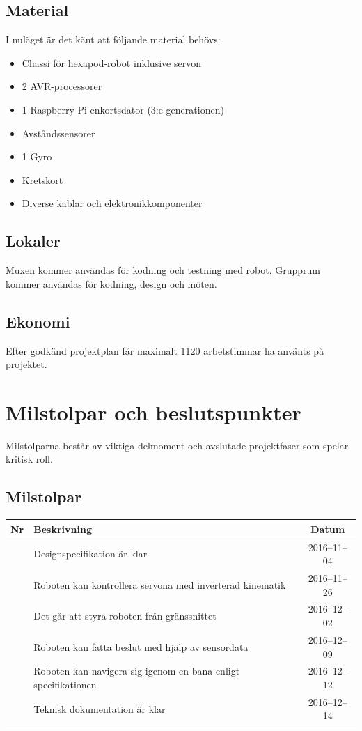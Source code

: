 \documentclass[a4paper,titlepage,12pt]{article}
\newcounter{milNr}
\newcommand{\nextMilNr}{\stepcounter{milNr}\arabic{milNr}}
\begin{document}
	\subsection{Material}
    I nuläget är det känt att följande material behövs:
	\begin{itemize}
			\item Chassi för hexapod-robot inklusive servon
			\item 2 AVR-processorer
			\item 1 Raspberry Pi-enkortsdator (3:e generationen)
			\item Avståndssensorer
            \item 1 Gyro
            \item Kretskort
            \item Diverse kablar och elektronikkomponenter
	\end{itemize}
	
	
	\subsection{Lokaler}
	Muxen kommer användas för kodning och testning med robot. Grupprum kommer
	användas för kodning, design och möten.
	
	
	\subsection{Ekonomi}
	Efter godkänd projektplan får maximalt 1120 arbetstimmar ha använts på projektet.
	
	
	\section{Milstolpar och beslutspunkter}
	Milstolparna består av viktiga delmoment och avslutade projektfaser som
  spelar kritisk roll. 
	
	\subsection{Milstolpar}
	\begin{longtable}[c]{ c l c}
		\textbf{Nr} & \textbf{Beskrivning} & \textbf{Datum} \\ \midrule
		\nextMilNr{} & Designspecifikation är klar & 2016--11--04 \\ \midrule
		\nextMilNr{} & Roboten kan kontrollera servona med inverterad kinematik
        & 2016--11--26 \\ \midrule
		\nextMilNr{} & Det går att styra roboten från gränssnittet &
        2016--12--02 \\ \midrule
		\nextMilNr{} & Roboten kan fatta beslut med hjälp av sensordata &
        2016--12--09 \\ \midrule
		\nextMilNr{} & Roboten kan navigera sig igenom en bana enligt
        specifikationen & 2016--12--12 \\ \midrule
		\nextMilNr{} & Teknisk dokumentation är klar & 2016--12--14 \\ \midrule
	\end{longtable}
	
\end{document}
